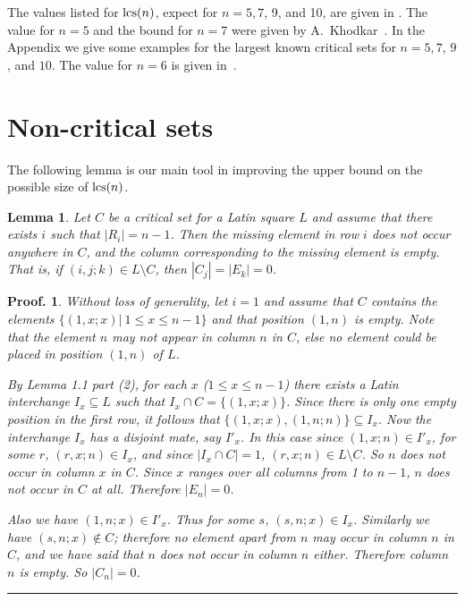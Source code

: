 \documentclass[12pt]{article}
\newtheorem{lemma}{Lemma}
\newtheorem{preproof}{{\bf Proof.}}
\newenvironment{proof}[1]{\begin{preproof}{\rm
               #1}\hfill{\rule[-0.5mm]{2mm}{2mm}}}{\end{preproof}}
\def\lcs#1{{\rm lcs}(#1)}
\begin{document}
The values listed for $\lcs{n}$, 
expect for $n = 5, 7$, 9, and 10,
are given in {\bf\cite{Don1}}.  The value for $n = 5$ and
the bound for $n=7$
were given by A.~Khodkar~{\bf\cite{kho}}.
In the Appendix  we give some examples for the largest
known critical sets for $n = 5, 7$, $9$, and $10$.
The value for $n = 6$ is given in~{\bf\cite{abk}}.

\section{Non-critical sets}    %
\setcounter{theorem}{0}
\setcounter{corollary}{0}
\setcounter{lemma}{0}
%
The following lemma is our main tool in improving the upper
bound on the possible size of $\lcs{n}$.
%
\begin{lemma}
\label{3.1}
Let $C$ be a critical set for a Latin square $L$ and assume that
there exists $i$
such that $|R_{i}| = n - 1$.
Then the missing element in row $i$ does not occur anywhere in $C$,
and the column corresponding to the missing element is empty.
That is, if ${(i, j; k)} \in L\setminus C$, then
$|C_{j}| =|E_{k}| =  0$.
\end{lemma}
%
\begin{proof}{
Without loss of generality, let $i=1$ and assume that
$C$ contains the elements $\{ (1,x;x) |\ 1 \leq x \leq n - 1\}$
and that position $(1,n)$ is empty.
Note that the element $n$ may not appear in column $n$ in $C$,
else no element could be placed in position $(1,n)$ of $L$.

By Lemma 1.1 part (2), for each $x$  ($1 \leq x \leq n-1 $)
there exists a Latin interchange $I_x \subseteq L$ such that
$I_x \cap C = \{ (1,x;x)\}$.
Since there is only one empty position in the first row, it follows that 
$\{ (1,x;x), (1,n;n) \} \subseteq I_x$.  Now the interchange $I_x$
has a disjoint mate, say $I'_x$.  In this case since
$ (1,x;n)  \in I'_x$,  for some $r$, $ (r,x; n)  \in I_x$, and since
$|I_x \cap C| = 1$,  $ (r,x;n) \in L\setminus C$.
So $n$ does not occur in column $x$ in $C$.
Since $x$ ranges over all columns from 1 to $n-1$,
$n$ does not occur in $C$ at all.
Therefore $|E_{n}| = 0$.

Also we have $(1,n;x)  \in I'_x$. Thus for some $s$, $ (s,n;x) \in I_x$.
Similarly we have $ (s,n;x)  \notin C$; therefore no element apart from
$n$ may occur in column $n$ in $C$, and we have said that $n$ does
not occur in column $n$ either. Therefore column $n$ is empty.
So $|C_{n}| = 0$.
}\end{proof}
\end{document}
